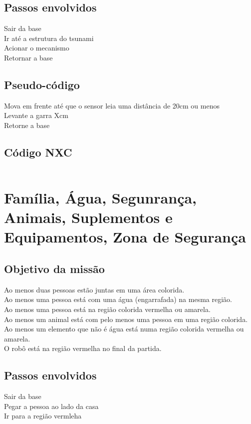 \documentclass{article}
\begin{document}
	\subsection{Passos envolvidos}
		Sair da base\\
		Ir até a estrutura do tsunami\\
		Acionar o mecanismo\\
		Retornar a base\\

	\subsection{Pseudo-código}
		Mova em frente até que o sensor leia uma distância de 20cm ou menos\\
		Levante a garra Xcm\\
		Retorne a base\\

	\subsection{Código NXC}
		\begin{tcolorbox}[]
			\inputminted{c}{codes/tsunami.nxc}
		\end{tcolorbox}

\newpage
\section{Família, Água, Segunrança, Animais, Suplementos e Equipamentos, Zona de Segurança}
	\subsection{Objetivo da missão}
		Ao menos duas pessoas estão juntas em uma área colorida.\\
		Ao menos uma pessoa está com uma água (engarrafada) na mesma região.\\
		Ao menos uma pessoa está na região colorida vermelha ou amarela.\\
		Ao menos um animal está com pelo menos uma pessoa em uma região colorida.\\
		Ao menos um elemento que não é água está numa região colorida vermelha ou amarela.\\
		O robô está na região vermelha no final da partida.\\

	\subsection{Passos envolvidos}
		Sair da base\\
		Pegar a pessoa ao lado da casa\\
		Ir para a região vermleha\\
\end{document}

